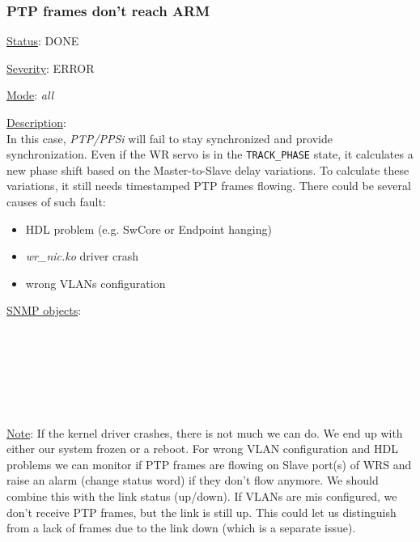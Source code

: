 \subsubsection{\bf PTP frames don't reach ARM}
		\label{fail:timing:no_frames}
		\begin{pck_descr}
			\item [] \underline{Status}: DONE
			\item [] \underline{Severity}: ERROR
			\item [] \underline{Mode}: \emph{all}
			\item [] \underline{Description}:\\
				In this case, \emph{PTP/PPSi} will fail to stay synchronized and provide
				synchronization. Even if the WR servo is in the \texttt{TRACK\_PHASE}
        state, it calculates a new phase shift based on the Master-to-Slave delay
				variations. To calculate these variations, it still needs timestamped
				PTP frames flowing. There could be several causes of such fault:
				\begin{itemize}
					\item HDL problem (e.g. SwCore or Endpoint hanging)
					\item \emph{wr\_nic.ko} driver crash
					\item wrong VLANs configuration
				\end{itemize}
			\item [] \underline{SNMP objects}:\\
        {\footnotesize
				\\
				\\
				\\
				\\
				\\
				\\
         }
			\item [] \underline{Note}: If the kernel driver crashes, there is not much
				we can do. We end up with either our system frozen or a reboot. For
				wrong VLAN configuration and HDL problems we can monitor if PTP frames
				are flowing on Slave port(s) of WRS and raise an alarm (change status
				word) if they don't flow anymore. We should combine this with the link
				status (up/down). If VLANs are mis configured, we don't receive PTP
				frames, but the link is still up. This could let us distinguish from a
				lack of frames due to the link down (which is a separate issue).
		\end{pck_descr}

